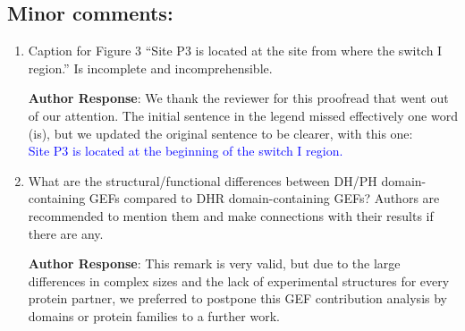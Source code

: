 \documentclass[11pt, a4paper]{article}
\begin{document}
\subsection{Minor comments:}
\begin{enumerate}
    \item Caption for Figure 3 “Site P3 is located at the site from where the switch I region.” Is incomplete and incomprehensible.

\textbf{Author Response}: We thank the reviewer for this proofread that went out of our attention. The initial sentence in the legend missed effectively one word (is), but we updated the original sentence to be clearer, with this one:\\
\textcolor{blue}{Site P3 is located at the beginning of the switch I region.}


    \item What are the structural/functional differences between DH/PH domain-containing GEFs compared to DHR domain-containing GEFs? Authors are recommended to mention them and make connections with their results if there are any.

\textbf{Author Response}: This remark is very valid, but due to the large differences in complex sizes and the lack of experimental structures for every protein partner, we preferred to postpone this GEF contribution analysis by domains or protein families to a further work.

    
\end{enumerate}
\end{document}
